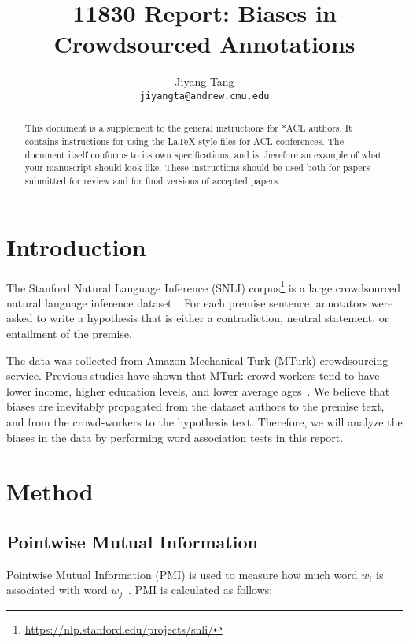 \documentclass[11pt]{article}
\title{11830 Report: Biases in Crowdsourced Annotations}
\author{
    Jiyang Tang \\
    \texttt{jiyangta@andrew.cmu.edu}
}
\begin{document}
    \maketitle
    \begin{abstract}
        This document is a supplement to the general instructions for *ACL authors. It contains instructions for using the \LaTeX{} style files for ACL conferences.
        The document itself conforms to its own specifications, and is therefore an example of what your manuscript should look like.
        These instructions should be used both for papers submitted for review and for final versions of accepted papers.
    \end{abstract}


    \section{Introduction}

    The Stanford Natural Language Inference (SNLI) corpus\footnote{\url{https://nlp.stanford.edu/projects/snli/}} is a large crowdsourced natural language
    inference dataset~\cite{snli}.
    For each premise sentence, annotators were asked to write a hypothesis that is either a contradiction,
    neutral statement, or entailment of the premise.

    The data was collected from Amazon Mechanical Turk (MTurk) crowdsourcing service.
    Previous studies have shown that MTurk crowd-workers tend to have lower income, higher education levels, and
    lower average ages~\cite{mturks_demography}.
    We believe that biases are inevitably propagated from the dataset authors to the premise text, and from the
    crowd-workers to the hypothesis text.
    Therefore, we will analyze the biases in the data by performing word association tests in this report.


    \section{Method}

    \subsection{Pointwise Mutual Information}

    Pointwise Mutual Information (PMI) is used to measure how much word $w_i$ is associated with word
    $w_j$~\cite{pmi,speech_and_nlp_book}.
    PMI is calculated as follows:
\end{document}
